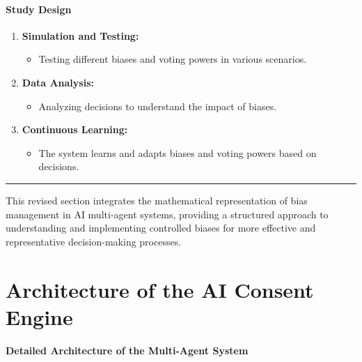 \documentclass{article}
\begin{document}
\hypertarget{study-design}{%
\paragraph{Study Design}\label{study-design}}

\begin{enumerate}
\def\labelenumi{\arabic{enumi}.}
\item
  \textbf{Simulation and Testing:}

  \begin{itemize}
  \item
    Testing different biases and voting powers in various scenarios.
  \end{itemize}
\item
  \textbf{Data Analysis:}

  \begin{itemize}
  \item
    Analyzing decisions to understand the impact of biases.
  \end{itemize}
\item
  \textbf{Continuous Learning:}

  \begin{itemize}
  \item
    The system learns and adapts biases and voting powers based on
    decisions.
  \end{itemize}
\end{enumerate}

\begin{center}\rule{0.5\linewidth}{0.5pt}\end{center}

This revised section integrates the mathematical representation of bias
management in AI multi-agent systems, providing a structured approach to
understanding and implementing controlled biases for more effective and
representative decision-making processes.

\hypertarget{architecture-of-the-ai-consent-engine}{%
\section*{Architecture of the AI Consent
Engine}\label{architecture-of-the-ai-consent-engine}}

\hypertarget{detailed-architecture-of-the-multi-agent-system}{%
\paragraph{Detailed Architecture of the Multi-Agent
System}\label{detailed-architecture-of-the-multi-agent-system}}
\end{document}

